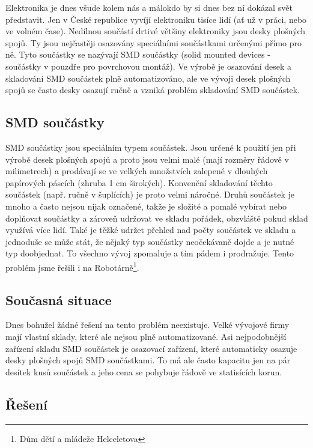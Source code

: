 \documentclass[12pt, a4paper, oneside]{article}
\begin{document}
Elektronika je dnes všude kolem nás a málokdo by si dnes bez ní dokázal svět představit. Jen v České republice vyvíjí elektroniku tisíce lidí (ať už v práci, nebo ve volném čase). Nedílnou součástí drtivé většiny elektroniky jsou desky plošných spojů. Ty jsou nejčastěji osazovány speciálními součástkami určenými přímo pro ně. Tyto součástky se nazývají SMD součástky (solid mounted devices - součástky v pouzdře pro povrchovou montáž). Ve výrobě je osazování desek a skladování SMD součástek plně automatizováno, ale ve vývoji desek plošných spojů se často desky osazují ručně a vzniká problém skladování SMD součástek.

\subsection{SMD součástky}

SMD součástky jsou speciálním typem součástek. Jsou určené k použití jen při výrobě desek plošných spojů a proto jsou velmi malé (mají rozměry řádově v milimetrech) a prodávají se ve velkých množstvích zalepené v dlouhých papírových páscích (zhruba 1 cm širokých). Konvenční skladování těchto součástek (např. ručně v šuplících) je proto velmi náročné. Druhů součástek je mnoho a často nejsou nijak označené, takže je složité a pomalé vybírat nebo doplňovat součástky a zároveň udržovat ve skladu pořádek, obzvláště pokud sklad využívá více lidí. Také je těžké udržet přehled nad počty součástek ve skladu a jednoduše se může stát, že nějaký typ součástky neočekávaně dojde a je nutné typ doobjednat. To všechno vývoj zpomaluje a tím pádem i prodražuje. Tento problém jsme řešili i na Robotárně\footnote{Dům dětí a mládeže Helceletova}.

\subsection{Současná situace}

Dnes bohužel žádné řešení na tento problém neexistuje. Velké vývojové firmy mají vlastní sklady, které ale nejsou plně automatizované. Asi nejpodobnější zařízení skladu SMD součástek je osazovací zařízení, které automaticky osazuje desky plošných spojů SMD součástkami. To má ale často kapacitu jen na pár desítek kusů součástek a jeho cena se pohybuje řádově ve statisících korun.

\subsection{Řešení}
\end{document}
